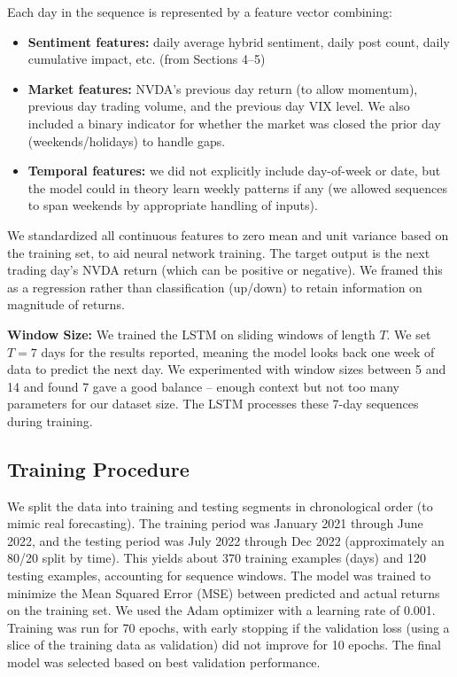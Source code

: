 \documentclass[conference]{IEEEtran}
\begin{document}
Each day in the sequence is represented by a feature vector combining:
\begin{itemize}
	\item \textbf{Sentiment features:} daily average hybrid sentiment, daily post count, daily cumulative impact, etc. (from Sections 4--5)
	\item \textbf{Market features:} NVDA’s previous day return (to allow momentum), previous day trading volume, and the previous day VIX level. We also included a binary indicator for whether the market was closed the prior day (weekends/holidays) to handle gaps.
	\item \textbf{Temporal features:} we did not explicitly include day-of-week or date, but the model could in theory learn weekly patterns if any (we allowed sequences to span weekends by appropriate handling of inputs).
\end{itemize}
We standardized all continuous features to zero mean and unit variance based on the training set, to aid neural network training. The target output is the next trading day’s NVDA return (which can be positive or negative). We framed this as a regression rather than classification (up/down) to retain information on magnitude of returns.

\textbf{Window Size:} We trained the LSTM on sliding windows of length $T$. We set $T = 7$ days for the results reported, meaning the model looks back one week of data to predict the next day. We experimented with window sizes between 5 and 14 and found 7 gave a good balance – enough context but not too many parameters for our dataset size. The LSTM processes these 7-day sequences during training.

\subsection{Training Procedure}
We split the data into training and testing segments in chronological order (to mimic real forecasting). The training period was January 2021 through June 2022, and the testing period was July 2022 through Dec 2022 (approximately an 80/20 split by time). This yields about 370 training examples (days) and 120 testing examples, accounting for sequence windows. The model was trained to minimize the Mean Squared Error (MSE) between predicted and actual returns on the training set. We used the Adam optimizer with a learning rate of 0.001. Training was run for 70 epochs, with early stopping if the validation loss (using a slice of the training data as validation) did not improve for 10 epochs. The final model was selected based on best validation performance.
\end{document}
